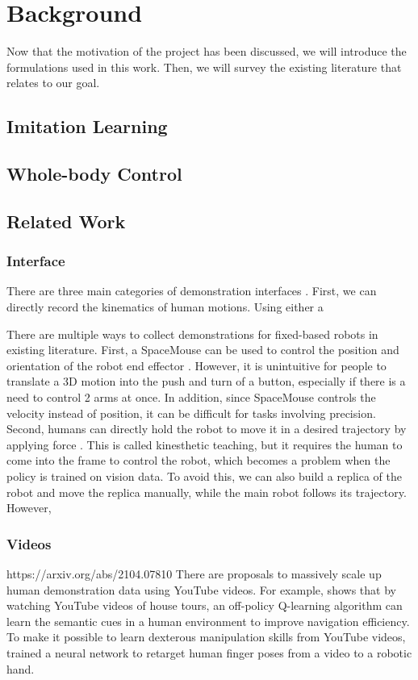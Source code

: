 \chapter{Background}

Now that the motivation of the project has been discussed, we will introduce the formulations used in this work. Then, we will survey the existing literature that relates to our goal.
\section{Imitation Learning}
\section{Whole-body Control}
\section{Related Work}

\subsection{Interface}
There are three main categories of demonstration interfaces \cite{Billard:2013}. First, we can directly record the kinematics of human motions. Using either a 

There are multiple ways to collect demonstrations for fixed-based robots in existing literature. First, a SpaceMouse can be used to control the position and orientation of the robot end effector \cite{zhu2022robosuite}. However, it is unintuitive for people to translate a 3D motion into the push and turn of a button, especially if there is a need to control 2 arms at once. In addition, since SpaceMouse controls the velocity instead of position, it can be difficult for tasks involving precision. Second, humans can directly hold the robot to move it in a desired trajectory by applying force \cite{Akgn2012KeyframebasedLF} \cite{Schulman2013LearningFD}. This is called kinesthetic teaching, but it requires the human to come into the frame to control the robot, which becomes a problem when the policy is trained on vision data. To avoid this, we can also build a replica of the robot and move the replica manually, while the main robot follows its trajectory. However, 
\subsection{Videos}

https://arxiv.org/abs/2104.07810
There are proposals to massively scale up human demonstration data using YouTube videos. For example, \cite{chang2020semantic} shows that by watching YouTube videos of house tours, an off-policy Q-learning algorithm can learn the semantic cues in a human environment to improve navigation efficiency. To make it possible to learn dexterous manipulation skills from YouTube videos, \cite{sivakumar2022robotic} trained a neural network to retarget human finger poses from a video to a robotic hand. 

